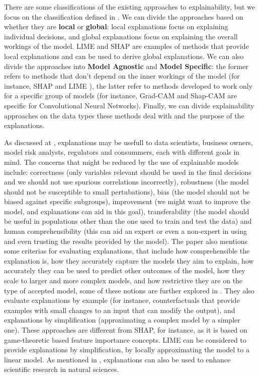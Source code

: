 There are some classifications of the existing approaches to explainability, but we focus on the classification defined in \cite{linardatos2020explainable}. We can divide the approaches based on whether they are \textbf{local} or \textbf{global}: local explanations focus on explaining individual decisions, and global explanations focus on explaining the overall workings of the model. LIME \cite{ribeiro2016should} and SHAP \cite{lundberg2017unified} are examples of methods that provide local explanations and can be used to derive global explanations. We can also divide the approaches into \textbf{Model Agnostic} and \textbf{Model Specific}: the former refers to methods that don't depend on the inner workings of the model (for instance, SHAP \cite{lundberg2017unified} and LIME \cite{ribeiro2016should}), the latter refer to methods developed to work only for a specific group of models (for instance, Grad-CAM and Shap-CAM are specific for Convolutional Neural Networks). Finally, we can divide explainability approaches on the data types these methods deal with and the purpose of the explanations.

As discussed at \cite{belle2021principles}, explanations may be usefull to data scientists, business owners, model risk analysts, regulators and consummers, each with different goals in mind. The concerns that might be reduced by the use of explainable models include: correctness (only variables relevant should be used in the final decisions and we should not use spurious correlations incorrectly), robustness (the model should not be susceptible to small pertubations), bias (the model should not be biased against specific subgroups), improvement (we might want to improve the model, and explanations can aid in this goal), transferability (the model should be useful in populations other than the one used to train and test the data) and human comprehensibility (this can aid an expert or even a non-expert in using and even trusting the results provided by the model). The paper also mentions some criterias for evaluating explanations, that include how comprehensible the explanation is, how they accurately capture the models they aim to explain, how accurately they can be used to predict other outcomes of the model, how they scale to larger and more complex models, and how restrictive they are on the type of accepted model, some of these notions are further explored in \cite{carvalho2019machine}. They also evaluate explanations by example (for instance, counterfactuals \cite{verma2020counterfactual} that provide examples with small changes to an input that can modify the output), and explanations by simplification (approximating a complex model by a simpler one). These approaches are different from SHAP, for instance, as it is based on game-theoretic based feature importance concepts. LIME can be considered to provide explanations by simplification, by locally approximating the model to a linear model. As mentioned in \cite{roscher2020explainable}, explanations can also be used to enhance scientific research in natural sciences.

